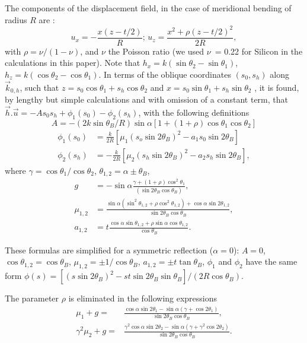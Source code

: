 \documentclass[preprint]{iucr}              %
\newcommand{\inred}[1]{{\color{red}#1}}
\begin{document}
The components of the displacement field, in the case of meridional bending of radius $R$ are \cite{Nesterets}:
\begin{equation}
    u_x = -\frac{x(z-t/2)}{R}; \, u_z=\frac{x^2+\rho(z-t/2)^2}{2R},
\end{equation}
with $\rho=\nu/(1-\nu)$, and $\nu$ the Poisson ratio (we used $\nu$~= 0.22 for Silicon in the calculations in this paper). 
Note that $h_x=k(\sin\theta_2-\sin\theta_1)$, $h_z=k(\cos\theta_2-\cos\theta_1)$.
In terms of the oblique coordinates $(s_0,s_h)$ along $\vec k_{0,h}$, such that $z=s_0\cos\theta_1 + s_h \cos\theta_2$ and $x=s_0 \sin\theta_1+s_h\sin\theta_2$ , 
it is found, by lengthy but simple calculations and with omission of a constant term, that $\vec h.\vec u=-A s_0 s_h + \phi_1(s_0) -\phi_2(s_h)$,  
with the following definitions
\begin{equation}
    A = -(2 k \sin\theta_B /R)\sin\alpha[1+(1+\rho)\cos\theta_1\cos\theta_2]
\end{equation}
\begin{align}
    \phi_1(s_0) &= \frac{k}{2R}[\mu_1(s_o\sin2\theta_B)^2-a_1 s_0\sin2\theta_B] \nonumber \\
    \phi_2(s_h) &= -\frac{k}{2R}[\mu_2(s_h\sin2\theta_B)^2-a_2 s_h\sin2\theta_B],
\end{align}
where $\gamma=\cos\theta_1/\cos\theta_2$, $\theta_{1,2}=\alpha\pm \theta_B$,
\begin{align}
   g &= -\sin\alpha\frac{\gamma +(1+\rho)\cos^2\theta_1}{(\sin2\theta_B\cos\theta_B)}, \nonumber \\
   \mu_{1,2} &=\frac{\sin\alpha(\sin^2\theta_{1,2}+\rho\cos^2\theta_{1,2})+\cos\alpha\sin2\theta_{1,2}}{\sin2\theta_B\cos\theta_B}, \nonumber \\
   a_{1,2} &=t\frac{\cos\alpha\sin\theta_{1,2}+\rho\sin\alpha\cos\theta_{1,2}}{\cos\theta_B}. \nonumber
\end{align}

These formulas are simplified for a symmetric reflection ($\alpha=0$):
$A=0$, $\cos\theta_{1,2}=\cos\theta_B$, $\mu_{1,2}=\pm1/\cos\theta_B$, $a_{1,2}=\pm t\tan\theta_B$, $\phi_1$ and  $\phi_2$ have the same form $\phi(s)=[(s\sin2\theta_B)^2-s t \sin2\theta_B\sin\theta_B] / (2 R \cos\theta_B)$. 

The parameter $\rho$ is eliminated in the following expressions 
\begin{align}
    \mu_1+g=&\frac{\cos\alpha\sin2\theta_1-\sin\alpha(\gamma+\cos2\theta_1)}{\sin2\theta_B\cos\theta_B},
    \\
    \gamma^2\mu_2+g=&\frac{\gamma^2\cos\alpha\sin2\theta_2-\sin\alpha(\gamma+\gamma^2\cos2\theta_2)}{\sin2\theta_B\cos\theta_B}.
\end{align}
\end{document}
